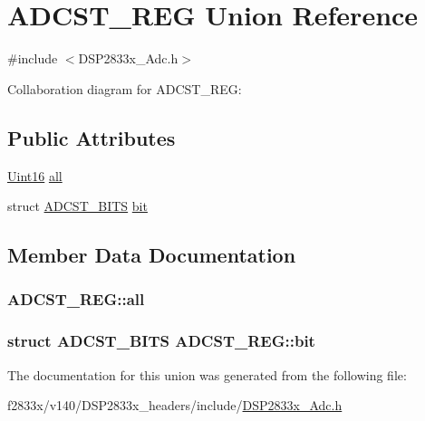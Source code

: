 \hypertarget{union_a_d_c_s_t___r_e_g}{}\section{A\+D\+C\+S\+T\+\_\+\+R\+E\+G Union Reference}
\label{union_a_d_c_s_t___r_e_g}


{\ttfamily \#include $<$D\+S\+P2833x\+\_\+\+Adc.\+h$>$}



Collaboration diagram for A\+D\+C\+S\+T\+\_\+\+R\+E\+G\+:
\subsection*{Public Attributes}
\begin{DoxyCompactItemize}
\item 
\hyperlink{_d_s_p2833x___device_8h_a59a9f6be4562c327cbfb4f7e8e18f08b}{Uint16} \hyperlink{union_a_d_c_s_t___r_e_g_a030fa524ff13d6e285ed440da9244d66}{all}
\item 
struct \hyperlink{struct_a_d_c_s_t___b_i_t_s}{A\+D\+C\+S\+T\+\_\+\+B\+I\+T\+S} \hyperlink{union_a_d_c_s_t___r_e_g_a5611458da207de11d112eddffbf3399e}{bit}
\end{DoxyCompactItemize}


\subsection{Member Data Documentation}
\hypertarget{union_a_d_c_s_t___r_e_g_a030fa524ff13d6e285ed440da9244d66}{}
\subsubsection[{all}]{ A\+D\+C\+S\+T\+\_\+\+R\+E\+G\+::all}\label{union_a_d_c_s_t___r_e_g_a030fa524ff13d6e285ed440da9244d66}
\hypertarget{union_a_d_c_s_t___r_e_g_a5611458da207de11d112eddffbf3399e}{}
\subsubsection[{bit}]{\setlength{\rightskip}{0pt plus 5cm}struct {\bf A\+D\+C\+S\+T\+\_\+\+B\+I\+T\+S} A\+D\+C\+S\+T\+\_\+\+R\+E\+G\+::bit}\label{union_a_d_c_s_t___r_e_g_a5611458da207de11d112eddffbf3399e}


The documentation for this union was generated from the following file\+:\begin{DoxyCompactItemize}
\item 
f2833x/v140/\+D\+S\+P2833x\+\_\+headers/include/\hyperlink{_d_s_p2833x___adc_8h}{D\+S\+P2833x\+\_\+\+Adc.\+h}\end{DoxyCompactItemize}
